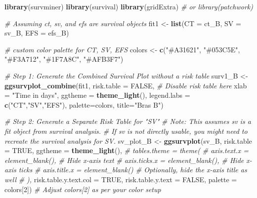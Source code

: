 \documentclass[
]{article}
\newenvironment{Shaded}{\begin{snugshade}}{\end{snugshade}}
\newcommand{\AttributeTok}[1]{\textcolor[rgb]{0.13,0.29,0.53}{#1}}
\newcommand{\CommentTok}[1]{\textcolor[rgb]{0.56,0.35,0.01}{\textit{#1}}}
\newcommand{\ConstantTok}[1]{\textcolor[rgb]{0.56,0.35,0.01}{#1}}
\newcommand{\DecValTok}[1]{\textcolor[rgb]{0.00,0.00,0.81}{#1}}
\newcommand{\FunctionTok}[1]{\textcolor[rgb]{0.13,0.29,0.53}{\textbf{#1}}}
\newcommand{\NormalTok}[1]{#1}
\newcommand{\OtherTok}[1]{\textcolor[rgb]{0.56,0.35,0.01}{#1}}
\newcommand{\StringTok}[1]{\textcolor[rgb]{0.31,0.60,0.02}{#1}}
\begin{document}
\begin{Shaded}
\begin{Highlighting}[]
\FunctionTok{library}\NormalTok{(survminer)}
\FunctionTok{library}\NormalTok{(survival)}
\FunctionTok{library}\NormalTok{(gridExtra) }\CommentTok{\# or library(patchwork)}

\CommentTok{\# Assuming ct, sv, and efs are survival objects}
\NormalTok{fit1 }\OtherTok{\textless{}{-}} \FunctionTok{list}\NormalTok{(}\AttributeTok{CT =}\NormalTok{ ct\_B, }\AttributeTok{SV =}\NormalTok{ sv\_B, }\AttributeTok{EFS =}\NormalTok{ efs\_B)}

\CommentTok{\# custom color palette for CT, SV, EFS}
\NormalTok{colors }\OtherTok{\textless{}{-}} \FunctionTok{c}\NormalTok{(}\StringTok{"\#A31621"}\NormalTok{, }\StringTok{"\#053C5E"}\NormalTok{, }\StringTok{"\#F3A712"}\NormalTok{, }\StringTok{"\#1F7A8C"}\NormalTok{, }\StringTok{"\#AFB3F7"}\NormalTok{)}

\CommentTok{\# Step 1: Generate the Combined Survival Plot without a risk table}
\NormalTok{surv1\_B }\OtherTok{\textless{}{-}} \FunctionTok{ggsurvplot\_combine}\NormalTok{(fit1,}
                        \AttributeTok{risk.table =} \ConstantTok{FALSE}\NormalTok{,  }\CommentTok{\# Disable risk table here}
                        \AttributeTok{xlab =} \StringTok{"Time in days"}\NormalTok{,}
                        \AttributeTok{ggtheme =} \FunctionTok{theme\_light}\NormalTok{(),}
                        \AttributeTok{legend.labs =} \FunctionTok{c}\NormalTok{(}\StringTok{"CT"}\NormalTok{,}\StringTok{"SV"}\NormalTok{,}\StringTok{"EFS"}\NormalTok{),}
                        \AttributeTok{palette=}\NormalTok{colors,}
                        \AttributeTok{title=}\StringTok{"Bras B"}\NormalTok{)}

\CommentTok{\# Step 2: Generate a Separate Risk Table for "SV"}
\CommentTok{\# Note: This assumes \textquotesingle{}sv\textquotesingle{} is a fit object from survival analysis.}
\CommentTok{\# If \textquotesingle{}sv\textquotesingle{} is not directly usable, you might need to recreate the survival analysis for SV.}
\NormalTok{sv\_plot\_B }\OtherTok{\textless{}{-}} \FunctionTok{ggsurvplot}\NormalTok{(sv\_B, }\AttributeTok{risk.table =} \ConstantTok{TRUE}\NormalTok{,}
                      \AttributeTok{ggtheme =} \FunctionTok{theme\_light}\NormalTok{(),}
                      \CommentTok{\# tables.theme = theme(}
                      \CommentTok{\#   axis.text.x = element\_blank(),  \# Hide x{-}axis text}
                      \CommentTok{\#   axis.ticks.x = element\_blank(), \# Hide x{-}axis ticks}
                      \CommentTok{\#   axis.title.x = element\_blank()  \# Optionally, hide the x{-}axis title as well}
                      \CommentTok{\# ),}
                      \AttributeTok{risk.table.y.text.col =} \ConstantTok{TRUE}\NormalTok{,}
                      \AttributeTok{risk.table.y.text =} \ConstantTok{FALSE}\NormalTok{,}
                      \AttributeTok{palette =}\NormalTok{ colors[}\DecValTok{2}\NormalTok{])  }\CommentTok{\# Adjust \textquotesingle{}colors[2]\textquotesingle{} as per your color setup}



\end{Highlighting}
\end{Shaded}
\end{document}
